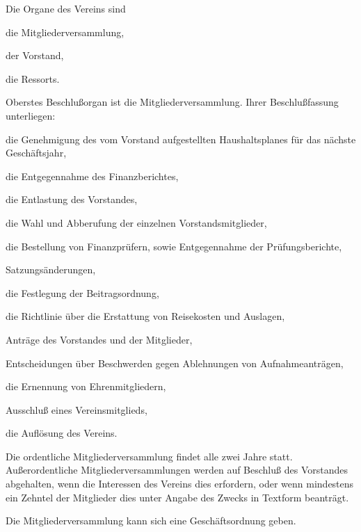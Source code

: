 \documentclass[draft]{scrartcl}
\begin{document}
\begin{contract}
Die Organe des Vereins sind

\begin{compactenum}[\hspace{2em}1.]
  \item die Mitgliederversammlung,
  \item der Vorstand,
  \item die Ressorts.
\end{compactenum}

\label{Mitgliederversammlung}

Oberstes Beschlußorgan ist die Mitgliederversammlung. Ihrer Beschlußfassung
unterliegen:

\begin{compactenum}[\hspace{2em}1.]
  \item die Genehmigung des vom Vorstand aufgestellten Haushaltsplanes für das
    näch\-ste Geschäftsjahr,
  \item die Entgegennahme des Finanzberichtes,
  \item die Entlastung des Vorstandes,
  \item die Wahl und Abberufung der einzelnen Vorstandsmitglieder,
  \item die Bestellung von Finanzprüfern, sowie Entgegennahme der
    Prüfungsberichte,
  \item Satzungsänderungen,
  \item die Festlegung der Beitragsordnung,
  \item die Richtlinie über die Erstattung von Reisekosten und Auslagen,
  \item Anträge des Vorstandes und der Mitglieder,
  \item Entscheidungen über Beschwerden gegen Ablehnungen von
    Aufnahmeanträgen,
  \item die Ernennung von Ehrenmitgliedern,
  \item Ausschluß eines Vereinsmitglieds,
  \item die Auf\/lösung des Vereins.
\end{compactenum}

Die ordentliche Mitgliederversammlung findet alle zwei Jahre statt.
Außerordentliche Mitgliederversammlungen werden auf Beschluß des Vorstandes
abgehalten, wenn die Interessen des Vereins dies erfordern, oder wenn
mindestens ein Zehntel der Mitglieder dies unter Angabe des Zwecks in Textform
beanträgt.

Die Mitgliederversammlung kann sich eine Geschäftsordnung geben.


\end{contract}
\end{document}
